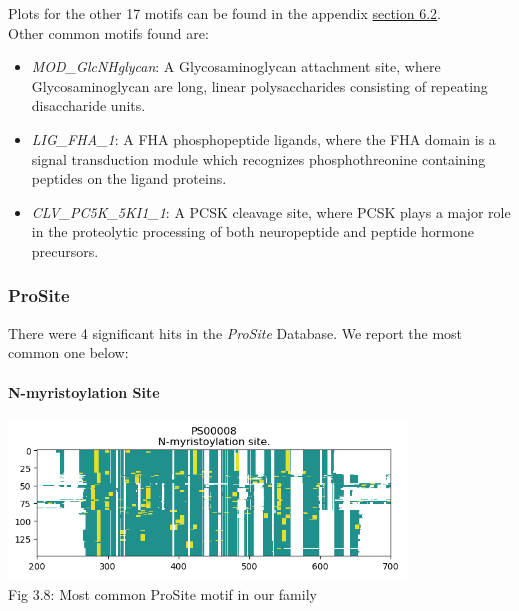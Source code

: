 \documentclass[10pt,twocolumn,letterpaper]{article}
\begin{document}
Plots for the other 17 motifs can be found in the appendix \hyperref[sec:elm_motifs]{section 6.2}. \\

Other common motifs found are:

\begin{itemize}
\item \textit{MOD\_GlcNHglycan}: A Glycosaminoglycan attachment site, where Glycosaminoglycan are long, linear polysaccharides consisting of repeating disaccharide units.
\item \textit{LIG\_FHA\_1}: A FHA phosphopeptide ligands, where the FHA domain is a signal transduction module which recognizes phosphothreonine containing peptides on the ligand proteins.
\item \textit{CLV\_PC5K\_5KI1\_1}: A PCSK cleavage site, where PCSK plays a major role in the proteolytic processing of both neuropeptide and peptide hormone precursors.
\end{itemize}


\subsubsection{ProSite}

There were 4 significant hits in the \textit{ProSite} Database. We report the most common one below:

\paragraph{N-myristoylation Site}

\begin{center}
    \includegraphics[scale=1.05]{report/img/prosite.png} \\
    \small{Fig 3.8: Most common ProSite motif in our family}
\end{center}
\end{document}
